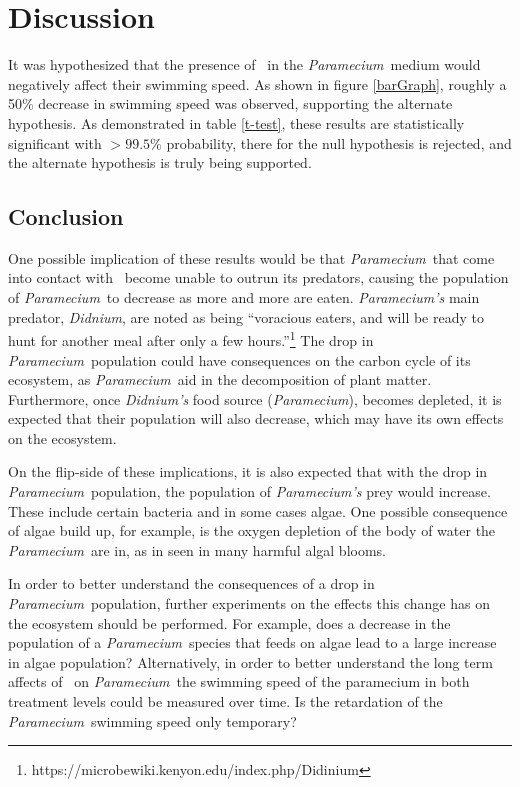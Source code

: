 \documentclass[12pt]{article}
\newcommand{\p}{\textit{Paramecium}}
\newcommand{\kcl}{\ce{KCl}}
\begin{document}
\section{Discussion}

It was hypothesized that the presence of \kcl\ in the \p\ medium would negatively affect their swimming speed. As shown in figure \ref{barGraph}, roughly a 50\% decrease in swimming speed
was observed, supporting the alternate hypothesis. As demonstrated in table \ref{t-test}, these results are statistically significant with $>99.5\%$ probability, there for the null hypothesis is rejected, and the alternate hypothesis is truly being supported.

\subsection{Conclusion}

One possible implication of these results would be that \p\ that come into contact with \kcl\ become unable to outrun its predators, causing the population of \p\ to decrease as more
and more are eaten. \textit{Paramecium's} main predator, \textit{Didnium}, are noted as being ``voracious eaters, and will be ready to hunt for another meal after only a few hours.''\footnote{https://microbewiki.kenyon.edu/index.php/Didinium} The drop in \p\ 
population could have consequences on the carbon cycle of its ecosystem, as \p\ aid in the decomposition of plant matter. Furthermore, once \textit{Didnium's} food source (\p), becomes depleted, it 
is expected that their population will also decrease, which may have its own effects on the ecosystem. 

On the flip-side of these implications, it is also expected that with the drop in \p\ population, the population of \textit{Paramecium's} prey would increase. These include certain bacteria and in some
cases algae. One possible consequence of algae build up, for example, is the oxygen depletion of the body of water the \p\ are in, as in seen in many harmful algal blooms. 

In order to better understand the consequences of a drop in \p\ population, further experiments on the effects this change has on the ecosystem should be performed. For example, does a decrease
in the population of a \p\ species that feeds on algae lead to a large increase in algae population? Alternatively, in order to better understand the long term affects of \kcl\ on \p\, the 
swimming speed of the paramecium in both treatment levels could be measured over time. Is the retardation of the \p\ swimming speed only temporary?
\end{document}
